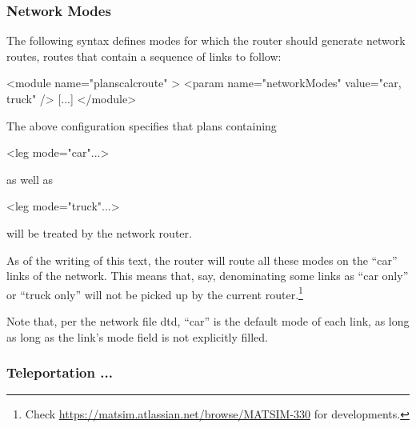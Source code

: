 \subsubsection{Network Modes}
\label{sec:network-modes}
The following syntax defines modes for which the router should generate network routes, \ie routes that contain a sequence of links to follow:
\begin{xml}
<module name="planscalcroute" >
   <param name="networkModes" value="car, truck" />
   [...]
</module>
\end{xml}
The above configuration specifies that plans containing
\begin{xml}
<leg mode="car"...>
\end{xml}
as well as
\begin{xml}
<leg mode="truck"...>
\end{xml}
will be treated by the network router.

As of the writing of this text, the router will route all these modes 
on the ``car'' links of the network.  This means that, say, denominating some links as ``car only'' or ``truck only'' will not be picked up by the current router.\footnote{%
%
Check \url{https://matsim.atlassian.net/browse/MATSIM-330} for developments.
%
}

Note that, per the network file \gls{dtd}, ``car'' is the default mode of each link, as long as long as the link's mode field is not explicitly filled. 




\subsubsection{Teleportation ...}
\label{sec:teleportation-routing}

